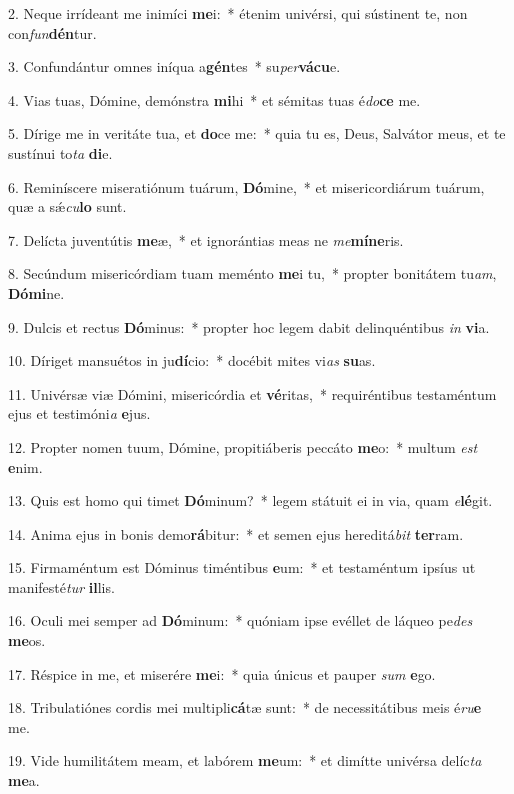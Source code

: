2. Neque irrídeant me inimíci \textbf{me}i:~*  étenim univérsi, qui sústinent te, non con\textit{fun}\textbf{dén}tur.\

3. Confundántur omnes iníqua a\textbf{gén}tes~*  su\textit{per}\textbf{vá}\textbf{cu}e.\

4. Vias tuas, Dómine, demónstra \textbf{mi}hi~*  et sémitas tuas é\textit{do}\textbf{ce} me.\

5. Dírige me in veritáte tua, et \textbf{do}ce me:~*  quia tu es, Deus, Salvátor meus, et te sustínui to\textit{ta} \textbf{di}e.\

6. Reminíscere miseratiónum tuárum, \textbf{Dó}mine,~*  et misericordiárum tuárum, quæ a sǽ\textit{cu}\textbf{lo} sunt.\

7. Delícta juventútis \textbf{me}æ,~*  et ignorántias meas ne \textit{me}\textbf{mí}\textbf{ne}ris.\

8. Secúndum misericórdiam tuam meménto \textbf{me}i tu,~*  propter bonitátem tu\textit{am}, \textbf{Dó}\textbf{mi}ne.\

9. Dulcis et rectus \textbf{Dó}minus:~*  propter hoc legem dabit delinquéntibus \textit{in} \textbf{vi}a.\

10. Díriget mansuétos in ju\textbf{dí}cio:~*  docébit mites vi\textit{as} \textbf{su}as.\

11. Univérsæ viæ Dómini, misericórdia et \textbf{vé}ritas,~*  requiréntibus testaméntum ejus et testimóni\textit{a} \textbf{e}jus.\

12. Propter nomen tuum, Dómine, propitiáberis peccáto \textbf{me}o:~*  multum \textit{est} \textbf{e}nim.\

13. Quis est homo qui timet \textbf{Dó}minum?~*  legem státuit ei in via, quam \textit{e}\textbf{lé}git.\

14. Anima ejus in bonis demo\textbf{rá}bitur:~*  et semen ejus hereditá\textit{bit} \textbf{ter}ram.\

15. Firmaméntum est Dóminus timéntibus \textbf{e}um:~*  et testaméntum ipsíus ut manifesté\textit{tur} \textbf{il}lis.\

16. Oculi mei semper ad \textbf{Dó}minum:~*  quóniam ipse evéllet de láqueo pe\textit{des} \textbf{me}os.\

17. Réspice in me, et miserére \textbf{me}i:~*  quia únicus et pauper \textit{sum} \textbf{e}go.\

18. Tribulatiónes cordis mei multipli\textbf{cá}tæ sunt:~*  de necessitátibus meis é\textit{ru}\textbf{e} me.\

19. Vide humilitátem meam, et labórem \textbf{me}um:~*  et dimítte univérsa delíc\textit{ta} \textbf{me}a.\

